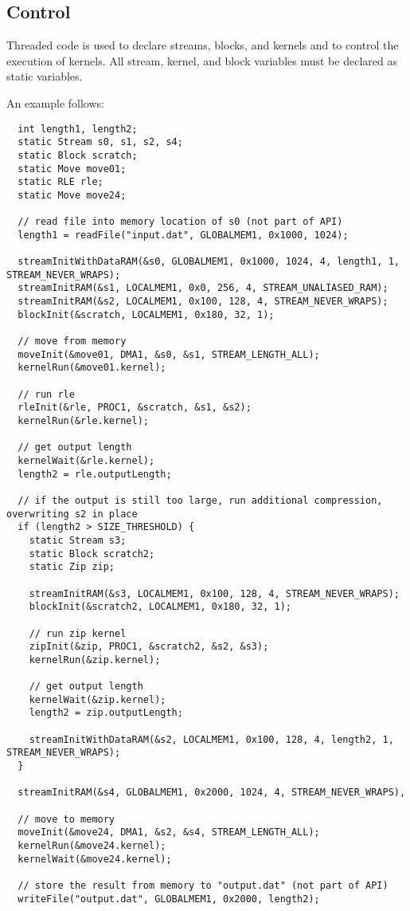 \subsection{Control}
\label{sec:control}

Threaded code is used to declare streams, blocks, and kernels and to
control the execution of kernels. All stream, kernel, and block
variables must be declared as static variables.

An example follows:
{\small
\begin{verbatim}
  int length1, length2;
  static Stream s0, s1, s2, s4;
  static Block scratch;
  static Move move01;
  static RLE rle;
  static Move move24;

  // read file into memory location of s0 (not part of API)
  length1 = readFile("input.dat", GLOBALMEM1, 0x1000, 1024);

  streamInitWithDataRAM(&s0, GLOBALMEM1, 0x1000, 1024, 4, length1, 1, STREAM_NEVER_WRAPS);
  streamInitRAM(&s1, LOCALMEM1, 0x0, 256, 4, STREAM_UNALIASED_RAM);
  streamInitRAM(&s2, LOCALMEM1, 0x100, 128, 4, STREAM_NEVER_WRAPS);
  blockInit(&scratch, LOCALMEM1, 0x180, 32, 1);

  // move from memory
  moveInit(&move01, DMA1, &s0, &s1, STREAM_LENGTH_ALL);
  kernelRun(&move01.kernel);
  
  // run rle
  rleInit(&rle, PROC1, &scratch, &s1, &s2);
  kernelRun(&rle.kernel);

  // get output length
  kernelWait(&rle.kernel);
  length2 = rle.outputLength;
  
  // if the output is still too large, run additional compression, overwriting s2 in place
  if (length2 > SIZE_THRESHOLD) {
    static Stream s3;
    static Block scratch2;
    static Zip zip;

    streamInitRAM(&s3, LOCALMEM1, 0x100, 128, 4, STREAM_NEVER_WRAPS);
    blockInit(&scratch2, LOCALMEM1, 0x180, 32, 1);

    // run zip kernel
    zipInit(&zip, PROC1, &scratch2, &s2, &s3);
    kernelRun(&zip.kernel);
    
    // get output length
    kernelWait(&zip.kernel);
    length2 = zip.outputLength;

    streamInitWithDataRAM(&s2, LOCALMEM1, 0x100, 128, 4, length2, 1, STREAM_NEVER_WRAPS);
  }
  
  streamInitRAM(&s4, GLOBALMEM1, 0x2000, 1024, 4, STREAM_NEVER_WRAPS),
  
  // move to memory
  moveInit(&move24, DMA1, &s2, &s4, STREAM_LENGTH_ALL);
  kernelRun(&move24.kernel);
  kernelWait(&move24.kernel);

  // store the result from memory to "output.dat" (not part of API)
  writeFile("output.dat", GLOBALMEM1, 0x2000, length2); \end{verbatim}}

